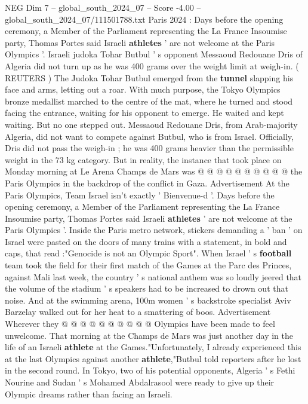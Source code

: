 \begin{textsample}{NEG Dim 7 – global\_south\_2024\_07 – Score -4.00 – global\_south\_2024\_07/111501788.txt}  \label{ex:f7_neg_338}
Paris 2024 : Days before the opening ceremony, a Member of the Parliament representing the La France Insoumise party, Thomas Portes said Israeli \textbf{athletes} ' are not welcome at the Paris Olympics '.
Israeli judoka Tohar Butbul ' s opponent Messaoud Redouane Dris of Algeria did not turn up as he was 400 grams over the weight limit at weigh-in. ( REUTERS ) The Judoka Tohar Butbul emerged from the \textbf{tunnel} slapping his face and arms, letting out a roar.
With much purpose, the Tokyo Olympics bronze medallist marched to the centre of the mat, where he turned and stood facing the entrance, waiting for his opponent to emerge.
He waited and kept waiting.
But no one stepped out.
Messaoud Redouane Dris, from Arab-majority Algeria, did not want to compete against Butbul, who is from Israel.
Officially, Dris did not pass the weigh-in ; he was 400 grams heavier than the permissible weight in the 73 kg category.
But in reality, the instance that took place on Monday morning at Le Arena Champs de Mars was @ @ @ @ @ @ @ @ @ @ the Paris Olympics in the backdrop of the conflict in Gaza.
Advertisement At the Paris Olympics, Team Israel isn't exactly ' Bienvenue-d '.
Days before the opening ceremony, a Member of the Parliament representing the La France Insoumise party, Thomas Portes said Israeli \textbf{athletes} ' are not welcome at the Paris Olympics '.
Inside the Paris metro network, stickers demanding a ' ban ' on Israel were pasted on the doors of many trains with a statement, in bold and caps, that read :"Genocide is not an Olympic Sport".
When Israel ' s \textbf{football} team took the field for their first match of the Games at the Parc des Princes, against Mali last week, the country ' s national anthem was so loudly jeered that the volume of the stadium ' s speakers had to be increased to drown out that noise.
And at the swimming arena, 100m women ' s backstroke specialist Aviv Barzelay walked out for her heat to a smattering of boos.
Advertisement Wherever they @ @ @ @ @ @ @ @ @ @ Olympics have been made to feel unwelcome.
That morning at the Champs de Mars was just another day in the life of an Israeli \textbf{athlete} at the Games."Unfortunately, I already experienced this at the last Olympics against another \textbf{athlete},"Butbul told reporters after he lost in the second round.
In Tokyo, two of his potential opponents, Algeria ' s Fethi Nourine and Sudan ' s Mohamed Abdalrasool were ready to give up their Olympic dreams rather than facing an Israeli.

\end{textsample}
